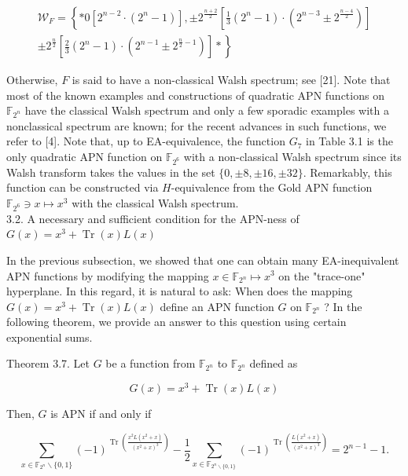 \documentclass[10pt]{article}
\begin{document}
$$
\begin{gathered}
\mathcal{W}_{F}=\left\{* 0\left[2^{n-2} \cdot\left(2^{n}-1\right)\right], \pm 2^{\frac{n+2}{2}}\left[\frac{1}{3}\left(2^{n}-1\right) \cdot\left(2^{n-3} \pm 2^{\frac{n-4}{2}}\right)\right]\right. \\
\left. \pm 2^{\frac{n}{2}}\left[\frac{2}{3}\left(2^{n}-1\right) \cdot\left(2^{n-1} \pm 2^{\frac{n}{2}-1}\right)\right] *\right\}
\end{gathered}
$$

Otherwise, $F$ is said to have a non-classical Walsh spectrum; see [21]. Note that most of the known examples and constructions of quadratic APN functions on $\mathbb{F}_{2^{n}}$ have the classical Walsh spectrum and only a few sporadic examples with a nonclassical spectrum are known; for the recent advances in such functions, we refer to [4]. Note that, up to EA-equivalence, the function $G_{7}$ in Table 3.1 is the only quadratic APN function on $\mathbb{F}_{2^{6}}$ with a non-classical Walsh spectrum since its Walsh transform takes the values in the set $\{0, \pm 8, \pm 16, \pm 32\}$. Remarkably, this function can be constructed via $H$-equivalence from the Gold APN function $\mathbb{F}_{2^{6}} \ni x \mapsto x^{3}$ with the classical Walsh spectrum.\\
3.2. A necessary and sufficient condition for the APN-ness of $G(x)=x^{3}+\operatorname{Tr}(x) L(x)$

In the previous subsection, we showed that one can obtain many EA-inequivalent APN functions by modifying the mapping $x \in \mathbb{F}_{2^{n}} \mapsto x^{3}$ on the "trace-one" hyperplane. In this regard, it is natural to ask: When does the mapping $G(x)= x^{3}+\operatorname{Tr}(x) L(x)$ define an APN function $G$ on $\mathbb{F}_{2^{n}}$ ? In the following theorem, we provide an answer to this question using certain exponential sums.

Theorem 3.7. Let $G$ be a function from $\mathbb{F}_{2^{n}}$ to $\mathbb{F}_{2^{n}}$ defined as

$$
G(x)=x^{3}+\operatorname{Tr}(x) L(x)
$$

Then, $G$ is APN if and only if


\begin{equation*}
\sum_{x \in \mathbb{F}_{2^{n}} \backslash\{0,1\}}(-1)^{\operatorname{Tr}\left(\frac{x^{2} L\left(x^{2}+x\right)}{\left(x^{2}+x\right)^{3}}\right)}-\frac{1}{2} \sum_{x \in \mathbb{F}_{2^{n} \backslash\{0,1\}}}(-1)^{\operatorname{Tr}\left(\frac{L\left(x^{2}+x\right)}{\left(x^{2}+x\right)^{3}}\right)}=2^{n-1}-1 . \tag{3.1}
\end{equation*}
\end{document}
